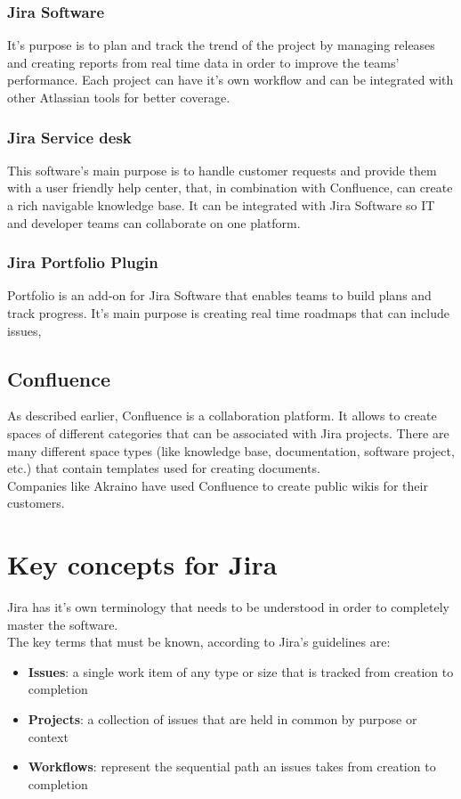 		\subsubsection{Jira Software}
			It's purpose is to plan and track the trend of the project by managing releases and creating reports from real time data in order to improve the teams' performance.
			Each project can have it's own workflow and can be integrated with other Atlassian tools for better coverage.
		
		\subsubsection{Jira Service desk}
			This software's main purpose is to handle customer requests and provide them with a user friendly help center, that, in combination with Confluence, can create a rich navigable knowledge base.
			It can be integrated with Jira Software so IT and developer teams can collaborate on one platform.

		\subsubsection{Jira Portfolio Plugin}
			Portfolio is an add-on for Jira Software that enables teams to build plans and track progress.
			It's main purpose is creating real time roadmaps that can include issues, 
		
	\subsection{Confluence}
		As described earlier, Confluence is a collaboration platform.
		It allows to create spaces of different categories that can be associated with Jira projects.
		There are many different space types (like knowledge base, documentation, software project, etc.) that contain templates used for creating documents.\\
		Companies like Akraino have used Confluence to create public wikis for their customers\cite{akraino}.
		
\section{Key concepts for Jira}
	Jira has it's own terminology that needs to be understood in order to completely master the software.\\
	The key terms that must be known, according to Jira's guidelines\cite{key-terms-to-know} are:
	\begin{itemize}
		\item \textbf{Issues}: a single work item of any type or size that is tracked from creation to completion
		\item \textbf{Projects}: a collection of issues that are held in common by purpose or context
		\item \textbf{Workflows}: represent the sequential path an issues takes from creation to completion
	\end{itemize}
	
